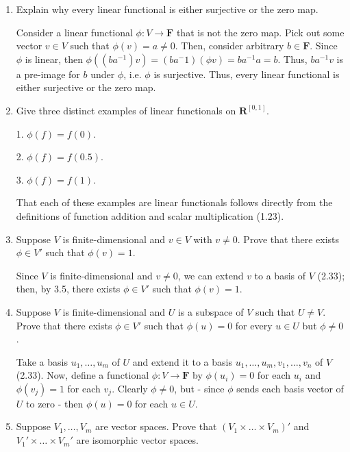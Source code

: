 \documentclass{book}
\begin{document}
\begin{enumerate}

\item Explain why every linear functional is either surjective or the zero map.

Consider a linear functional \(\phi: V \rightarrow \textbf{F}\) that is not the zero map.  Pick out some vector \(v \in V\) such that \(\phi(v)=a \neq 0\).  Then, consider arbitrary \(b \in \textbf{F}\).  Since \(\phi\) is linear, then \(\phi((ba^{-1})v)=(ba^-1)(\phi v)=ba^{-1}a=b\). Thus, \(ba^{-1}v\) is a pre-image for \(b\) under \(\phi\), i.e. \(\phi\) is surjective.  Thus, every linear functional is either surjective or the zero map.

\item Give three distinct examples of linear functionals on \(\textbf{R}^{[0,1]}\).

1.  \(\phi(f)=f(0)\).

2.  \(\phi(f)=f(0.5)\).

3.  \(\phi(f)=f(1)\).

That each of these examples are linear functionals follows directly from the definitions of function addition and scalar multiplication (1.23).

\item Suppose \(V\) is finite-dimensional and \(v \in V\) with \(v \neq 0\).  Prove that there exists \(\phi \in V'\) such that \(\phi(v)=1\).

Since \(V\) is finite-dimensional and \(v \neq 0\), we can extend \(v\) to a basis of \(V\) (2.33); then, by 3.5, there exists \(\phi \in V'\) such that \(\phi(v)=1\).

\item Suppose \(V\) is finite-dimensional and \(U\) is a subspace of \(V\) such that \(U \neq V\).  Prove that there exists \(\phi \in V'\) such that \(\phi(u)=0\) for every \(u \in U\) but \(\phi \neq 0\).

Take a basis \(u_1,\dots,u_m\) of \(U\) and extend it to a basis \(u_1,\dots,u_m,v_1,\dots,v_n\) of \(V\) (2.33).  Now, define a functional \(\phi:V \rightarrow \textbf{F}\) by \(\phi(u_i)=0\) for each \(u_i\) and \(\phi(v_j)=1\) for each \(v_j\).  Clearly \(\phi \neq 0\), but - since \(\phi\) sends each basis vector of \(U\) to zero - then \(\phi(u)=0\) for each \(u \in U\).

\item Suppose \(V_1,\dots,V_m\) are vector spaces.  Prove that \((V_1 \times \dots \times V_m)'\) and \(V_1' \times \dots \times V_m'\) are isomorphic vector spaces.


\end{enumerate}
\end{document}
